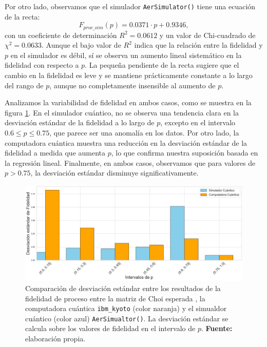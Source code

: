\documentclass[letterpaper,12pt]{thesisECFM}
\theoremstyle{plain}
\theoremstyle{definition}
\theoremstyle{definition}
\theoremstyle{remark}
\newcommand{\1}{\mathbb{1}}
\begin{document}
Por otro lado, observamos que el simulador \texttt{AerSimulator()} tiene una
ecuación de la recta:
\begin{equation}
    F_{proc\_sim}(p) = 0.0371 \cdot p + 0.9346,
\end{equation}
con un coeficiente de determinación $R^2 = 0.0612$ y un valor de Chi-cuadrado
de $\chi^2 = 0.0633$. 
Aunque el bajo valor de $R^2$ indica que la relación entre la fidelidad y $p$
en el simulador es débil, sí se observa un aumento lineal sistemático en la
fidelidad con respecto a $p$. La pequeña pendiente de la recta sugiere que el
cambio en la fidelidad es leve y se mantiene prácticamente constante a lo largo
del rango de $p$, aunque no completamente insensible al aumento de $p$.

Analizamos la variabilidad de fidelidad en ambos casos, como se muestra en la
figura \ref{fig:comparacion_desviaciones}. En el simulador cuántico, no se
observa una tendencia clara en la desviación estándar de la fidelidad a lo
largo de $p$, excepto en el intervalo $0.6 \le p \leq 0.75$, que parece ser una
anomalía en los datos. Por otro lado, la computadora cuántica muestra una
reducción en la desviación estándar de la fidelidad a medida que aumenta $p$,
lo que confirma nuestra suposición basada en la regresión lineal. Finalmente,
en ambos casos, observamos que para valores de $p>0.75$, la desviación estándar
disminuye significativamente.


\begin{figure}[h!] %
    \centering
    \includegraphics[width=0.95\linewidth]{imagenes/Comparacion_desviaciones.png}
    \caption{Comparación de desviación estándar entre los resultados de la fidelidad de proceso entre la matriz de Choi esperada , la computadora cuántica \texttt{ibm\_kyoto} (color naranja) y el simualdor cuántico (color azul) \texttt{AerSimualtor()}. La desviación estándar se calcula sobre los valores de fidelidad en el intervalo de $p$. \textbf{Fuente:} elaboración propia.}
    \label{fig:comparacion_desviaciones}
\end{figure} %
\end{document}
